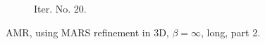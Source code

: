 \documentclass[a4paper,12pt]{amsart}
\numberwithin{equation}{section}
\begin{document}
\begin{figure}[h!]
\begin{subfigure}[t]{0.49\textwidth}
    \caption{Iter. No. 20.}
\end{subfigure}

\caption{AMR, using MARS refinement in 3D, $\beta = \infty$, long, part 2.}
\label{fig:amr_trans3D_paraview_mars_longrun_part2}
\end{figure}
\end{document}

